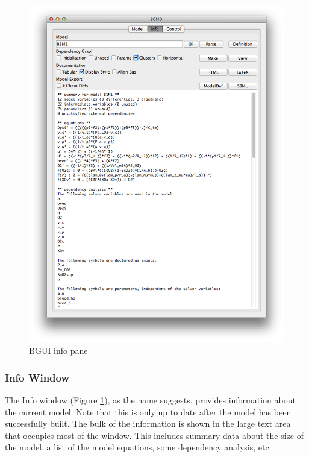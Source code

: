 \documentclass[a4paper,11pt]{article}
\begin{document}
\begin{figure}[tbph]
\begin{center}
\includegraphics[scale=0.5]{figures/info.png}
\caption{BGUI info pane}
\label{fig:bgui:info}
\end{center}
\end{figure}

\subsubsection{Info Window}\label{bgui:info}

The Info window (Figure \ref{fig:bgui:info}), as the name suggests, provides information about the current model. Note that this is only up to date after the model has been successfully built. The bulk of the information is shown in the large text area that occupies most of the window. This includes summary data about the size of the model, a list of the model equations, some dependency analysis, etc.
\end{document}
